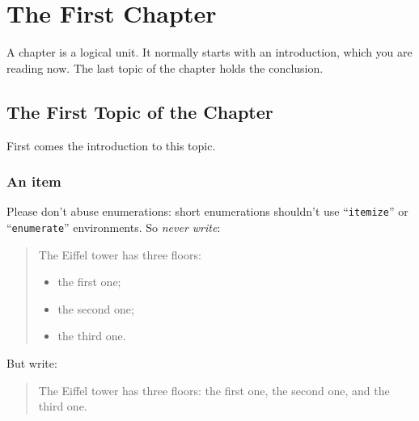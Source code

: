 %
%
%
%
%
%
%

\chapter{The First Chapter}
\label{cha:1}
A chapter is a logical unit. It normally starts with an introduction, which
you are reading now. The last topic of the chapter holds the conclusion.

\section{The First Topic of the Chapter}
First comes the introduction to this topic.

\lipsum[55]

\subsection{An item}
Please don't abuse enumerations: short enumerations shouldn't use
``\verb|itemize|'' or ``\texttt{enumerate}'' environments.
So \emph{never write}: 
\begin{quote}
  The Eiffel tower has three floors:
  \begin{itemize}
  \item the first one;
  \item the second one;
  \item the third one.
  \end{itemize}
\end{quote}
But write:
\begin{quote}
  The Eiffel tower has three floors: the first one, the second one, and the
  third one.
\end{quote}

